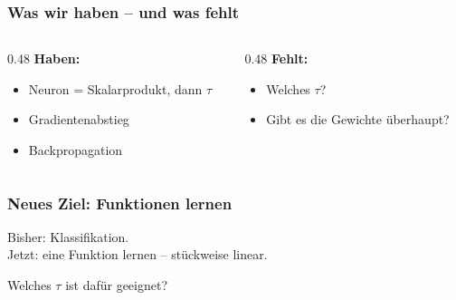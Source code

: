 \begin{frame}
  \frametitle{Was wir haben -- und was fehlt}

  \begin{columns}[t]
    \begin{column}{0.48\textwidth}
      \textbf{Haben:}
      \begin{itemize}
      \item Neuron = Skalarprodukt, dann $\tau$
      \item Gradientenabstieg
      \item Backpropagation
      \end{itemize}
    \end{column}
    \begin{column}{0.48\textwidth}
      \textbf{Fehlt:}
      \begin{itemize}
      \item Welches $\tau$?
      \item Gibt es die Gewichte überhaupt?
      \end{itemize}
    \end{column}
  \end{columns}

\end{frame}

\begin{frame}
  \frametitle{Neues Ziel: Funktionen lernen}

  \begin{center}
    \Large
    Bisher: Klassifikation.\\[12pt]
    Jetzt: eine Funktion lernen -- stückweise linear.
  \end{center}

  \bigskip
  \begin{center}
    Welches $\tau$ ist dafür geeignet?
  \end{center}

\end{frame}

